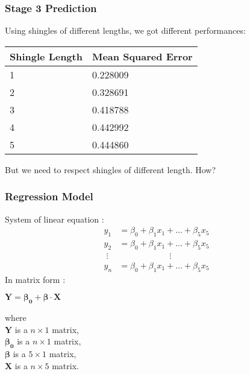 \documentclass[11pt]{beamer}
\begin{document}
\begin{frame}
\frametitle{Stage 3 Prediction}

	Using shingles of different lengths, we got different performances:

	\begin{center}
		\begin{tabular}{ll}
			\toprule
				Shingle Length & Mean Squared Error \\
			\midrule
				1 & 0.228009 \\
				2 & 0.328691 \\
				3 & 0.418788 \\
				4 & 0.442992 \\
				5 & 0.444860 \\
			\bottomrule
		\end{tabular}
	\end{center}
	\vspace{5mm}
	But we need to respect shingles of different length. How?

\end{frame}


\begin{frame}
\frametitle{Regression Model}
\begin{tcolorbox}[colback=blue!5,colframe=blue!40!black,title=Regression model]
System of linear equation :
\begin{equation}
\begin{alignedat}{4}
y_1 &= \beta_0  + \beta_1 x_1 + \dots + \beta_5 x_5\\
y_2 &= \beta_0 + \beta_1 x_1 + \dots + \beta_5 x_5\\
\;\vdots  &            \qquad\qquad\qquad\vdots \\
y_n &= \beta_0 + \beta_1 x_1 + \dots + \beta_5 x_5
\end{alignedat}
\end{equation}
In matrix form :

\centering
\(\textbf{Y}= \boldsymbol{\beta_0}+\boldsymbol{\beta} \cdot \textbf{X}\)

\raggedright
where\\
\(\textbf{Y}\) is a \(n\times1\) matrix,\\
\(\boldsymbol{\beta_0}\) is a \(n\times 1\) matrix,\\
\(\boldsymbol{\beta}\) is a \(5\times 1\) matrix,\\
\(\textbf{X}\) is a \(n\times 5\) matrix.
\end{tcolorbox}
\end{frame}
\end{document}
